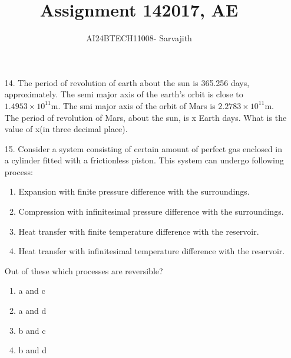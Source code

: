 \documentclass[journal]{IEEEtran}
\begin{document}

\vspace{3cm}


\author{AI24BTECH11008- Sarvajith
}
\title{Assignment 14}
{\let\newpage\relax\maketitle}
\title{2017, AE}
\renewcommand{\thefigure}{\theenumi}
\renewcommand{\thetable}{\theenumi}
\setlength{\intextsep}{10pt} %
\renewcommand{\thetable}{\theenumi}
\begin{enumerate}
    \item[14.] The period of revolution of earth about the sun is 365.256 days, approximately. The semi major axis of the earth's orbit is close to $1.4953\times 10^{11}$m. The smi major axis of the orbit of Mars is $2.2783\times 10^{11}$m. The period of revolution of Mars, about the sun, is x Earth days. What is the value of x(in three decimal place).
    \item[15.] Consider a system consisting of certain amount of perfect gas enclosed in a cylinder fitted with a frictionless piston. This system can undergo following process:
    \begin{enumerate}
        \item Expansion with finite pressure difference with the surroundings.
        \item Compression with infinitesimal pressure difference with the surroundings.
        \item Heat transfer with finite temperature difference with the reservoir.
        \item Heat transfer with infinitesimal temperature difference with the reservoir.
    \end{enumerate}
    Out of these which processes are reversible?
    \begin{enumerate}[label=(\Alph*)]
        \item a and c
        \item a and d 
        \item b and c 
        \item b and d 
    \end{enumerate}
    

\end{enumerate}
\end{document}
